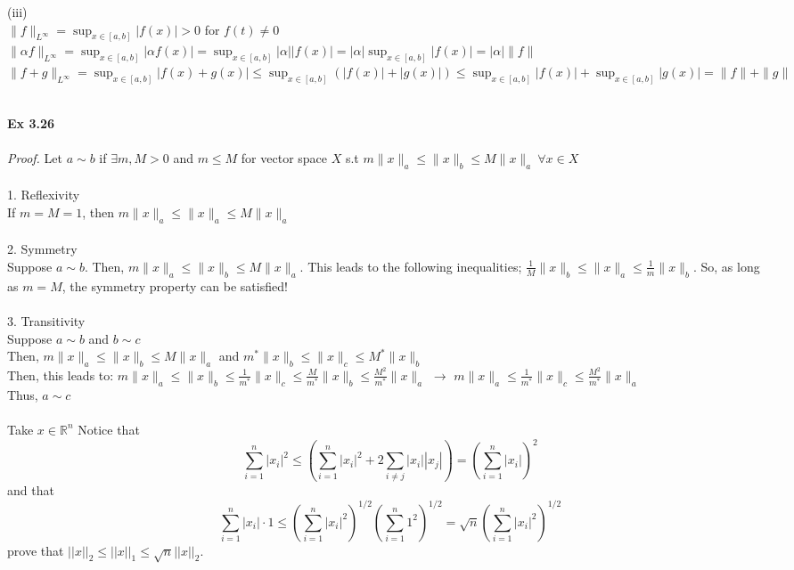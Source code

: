 \documentclass[letterpaper,12pt]{article}
\theoremstyle{definition}
\begin{document}
\begin{spacing}{1.3}{}
	(iii) \\
	
	$\|f\|_{L^{\infty}} = \sup_{x \in [a,b]} |f(x)| >0$ for $f(t) \neq 0$ \\
	
	$\|\alpha f\|_{L^{\infty}} = \sup_{x \in [a,b]} |\alpha f(x)| = \sup_{x \in [a,b]} |\alpha| |f(x)| = |\alpha| \sup_{x \in [a,b]} |f(x)| = |\alpha| \|f\|$\\
	
	$\|f+g\|_{L^{\infty}} = \sup_{x \in [a,b]} |f(x)+g(x)| \leq \sup_{x \in [a,b]} (|f(x)|+|g(x)|) \leq \sup_{x \in [a,b]} |f(x)| + \sup_{x \in [a,b]} |g(x)| = \|f\| + \|g\| $ \\\\
	
	
	\setlength{\leftskip}{10pt}
	
	\textbf{Ex 3.26} \\\\
	\emph{Proof.} Let $a \sim b$ if $\exists m,M > 0$ and $m \leq M$ for vector space $X$ s.t $m \|x\|_{a} \leq \|x\|_{b} \leq M \|x\|_{a} \ \forall x \in X$ \\\\
	
	1. Reflexivity\\
	If $m = M = 1$, then $m \|x\|_{a} \leq \|x\|_{a} \leq M \|x\|_{a}$ \\\\
	2. Symmetry \\
	Suppose $a \sim b$. Then, $m \|x\|_{a} \leq \|x\|_{b} \leq M \|x\|_{a}$. This leads to the following inequalities; $\frac{1}{M} \|x\|_{b} \leq \|x\|_{a} \leq \frac{1}{m} \|x\|_{b}$. So, as long as $m=M$, the symmetry property can be satisfied! \\\\
	3. Transitivity \\
	Suppose $a \sim b$ and $b \sim c$ \\
	Then, $m \|x\|_{a} \leq \|x\|_{b} \leq M \|x\|_{a}$ and $m^* \|x\|_{b} \leq \|x\|_{c} \leq M^* \|x\|_{b}$ \\
	Then, this leads to: $m \|x\|_{a} \leq \|x\|_{b} \leq \frac{1}{m^*} \|x\|_{c} \leq \frac{M}{m^*} \|x\|_b \leq \frac{M^2}{m^*} \|x\|_a$ $\rightarrow$ $m \|x\|_{a} \leq \frac{1}{m^*}\|x\|_{c} \leq \frac{M^2}{m^*} \|x\|_{a}$ \\
	Thus, $a \sim c$ \\\\
	
	
	Take $x\in\mathbb R^n$
	Notice that
	\begin{equation*}
	\sum_{i=1}^n|x_i|^2\leq
	\left(\sum_{i=1}^n|x_i|^2+2\sum_{i\neq j}|x_i||x_j|\right)=
	\left(\sum_{i=1}^n|x_i|\right)^2
	\end{equation*}
	and that
	\begin{equation*}
	\sum_{i=1}^n|x_i|\cdot1\leq
	\left(\sum_{i=1}^n|x_i|^2\right)^{1/2}\left(\sum_{i=1}^n1^2\right)^{1/2}=
	\sqrt{n}\left(\sum_{i=1}^n|x_i|^2\right)^{1/2}
	\end{equation*}
	prove that $||x||_2\leq||x||_1\leq\sqrt{n}||x||_2$.
	

\end{spacing}
\end{document}
